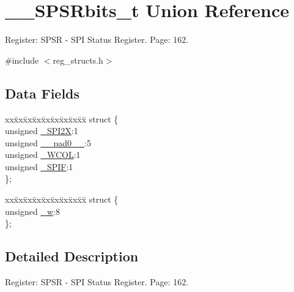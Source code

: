 \hypertarget{union_____s_p_s_rbits__t}{\section{\+\_\+\+\_\+\+S\+P\+S\+Rbits\+\_\+t Union Reference}
\label{union_____s_p_s_rbits__t}
}


Register\+: S\+P\+S\+R -\/ S\+P\+I Status Register. Page\+: 162.  




{\ttfamily \#include $<$reg\+\_\+structs.\+h$>$}

\subsection*{Data Fields}
\begin{DoxyCompactItemize}
\item 
\begin{tabbing}
xx\=xx\=xx\=xx\=xx\=xx\=xx\=xx\=xx\=\kill
struct \{\\
\>unsigned \hyperlink{union_____s_p_s_rbits__t_adf8c5ae0c13376fefe8ea84bb2a8cc3d}{\_SPI2X}:1\\
\>unsigned \hyperlink{union_____s_p_s_rbits__t_a88a39481148a220348dc582e83a5799c}{\_\_pad0\_\_}:5\\
\>unsigned \hyperlink{union_____s_p_s_rbits__t_ab82ac5db76de0e95351ec9b405834383}{\_WCOL}:1\\
\>unsigned \hyperlink{union_____s_p_s_rbits__t_a9a5003c1b452c02f565efacedae8cb80}{\_SPIF}:1\\
\}; \\

\end{tabbing}\item 
\begin{tabbing}
xx\=xx\=xx\=xx\=xx\=xx\=xx\=xx\=xx\=\kill
struct \{\\
\>unsigned \hyperlink{union_____s_p_s_rbits__t_aa379e60332583517d9e5a20af8980590}{\_w}:8\\
\}; \\

\end{tabbing}\end{DoxyCompactItemize}


\subsection{Detailed Description}
Register\+: S\+P\+S\+R -\/ S\+P\+I Status Register. Page\+: 162. 


